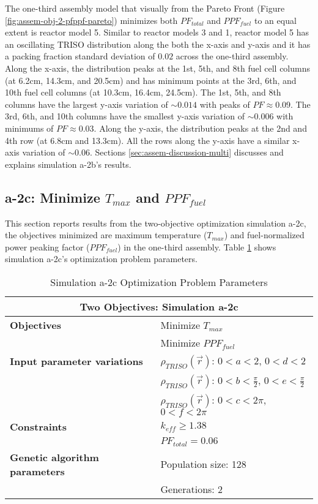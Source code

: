 The one-third assembly model that visually from the Pareto Front (Figure 
\ref{fig:assem-obj-2-pfppf-pareto}) minimizes both $PF_{total}$ and $PPF_{fuel}$ 
to an equal extent is reactor model 5. 
Similar to reactor models 3 and 1, reactor model 5 has an oscillating TRISO distribution 
along the both the x-axis and y-axis and it has a packing fraction standard deviation 
of $0.02$ across the one-third assembly.
Along the x-axis, the distribution peaks at the 1st, 5th, and 8th fuel cell columns 
(at 6.2cm, 14.3cm, and 20.5cm) and has minimum points at the 3rd, 6th, and 10th fuel 
cell columns (at 10.3cm, 16.4cm, 24.5cm). 
The 1st, 5th, and 8th columns have the largest y-axis variation of $\sim0.014$ with 
peaks of $PF\approx0.09$. 
The 3rd, 6th, and 10th columns have the smallest y-axis variation of $\sim0.006$ with 
minimums of $PF\approx0.03$. 
Along the y-axis, the distribution peaks at the 2nd and 4th row (at 6.8cm and 13.3cm). 
All the rows along the y-axis have a similar x-axis variation of $\sim0.06$.
Sections \ref{sec:assem-discussion-multi} discusses and explains simulation a-2b's 
results.

\subsection{a-2c: Minimize $T_{max}$ and $PPF_{fuel}$}
\label{sec:a-2c}
This section reports results from the two-objective optimization simulation a-2c, the 
objectives minimized are maximum temperature ($T_{max}$) and fuel-normalized power 
peaking factor ($PPF_{fuel}$) in the one-third assembly.  
Table \ref{tab:simulationa2c} shows simulation a-2c's optimization problem parameters. 
\begin{table}[htbp!]
    \centering
    \onehalfspacing
    \caption{Simulation a-2c Optimization Problem Parameters}
	\label{tab:simulationa2c}
    \footnotesize
    \begin{tabular}{l|p{5.3cm}}
    \hline 
    \multicolumn{2}{c}{\textbf{Two Objectives: Simulation a-2c}} \\
    \hline 
    \textbf{Objectives} & Minimize $T_{max}$ \\
    & Minimize $PPF_{fuel}$ \\
    \hline 
    \textbf{Input parameter variations}
    & $\rho_{TRISO}(\vec{r})$: $0<a<2$, $0<d<2$\\
    & $\rho_{TRISO}(\vec{r})$: $0<b<\frac{\pi}{2}$, $0<e<\frac{\pi}{2}$\\
    & $\rho_{TRISO}(\vec{r})$: $0<c<2\pi$, $0<f<2\pi$\\
    \hline
    \textbf{Constraints} & $k_{eff} \geq 1.38$\\ 
    & $PF_{total} = 0.06$\\
    \hline 
    \textbf{Genetic algorithm parameters} & Population size: 128 \\
    & Generations: 2 \\
    \hline
    \end{tabular}
\end{table}

